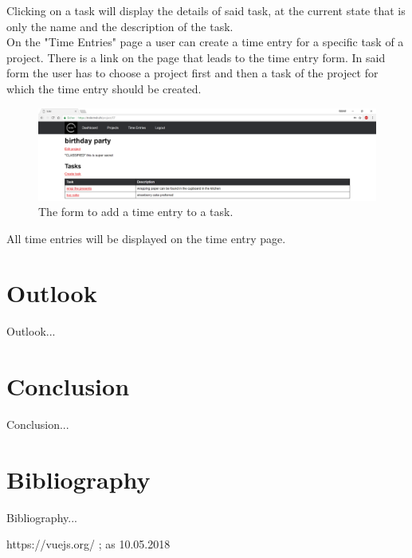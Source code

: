 \documentclass[a4paper, 12pt, headsepline]{scrartcl}
\begin{document}
Clicking on a task will display the details of said task, at the current state
that is only the name and the description of the task.\\
On the "Time Entries" page a user can create a time entry for a specific task of
a project. There is a link on the page that leads to the time entry form. In
said form the user has to choose a project first and then a task of the project
for which the time entry should be created.

\begin{figure}[h]
    \includegraphics[width=\textwidth]{trckr-project-page}
    \caption{The form to add a time entry to a task.}
    \label{fig:trckr-create-time-entry}
\end{figure}

All time entries will be displayed on the time entry page.

\section{Outlook}
Outlook...

\section{Conclusion}
Conclusion...

\section{Bibliography}
Bibliography...
\begin{thebibliography}{9}

    https://vuejs.org/ ; as 10.05.2018


\end{thebibliography}

\listoffigures
\end{document}
